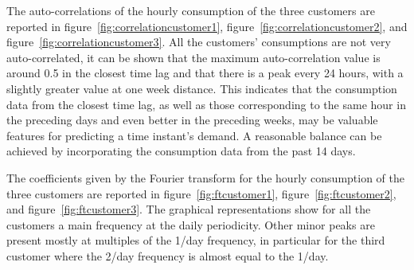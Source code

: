 The auto-correlations of the hourly consumption of the three customers are reported in figure~\ref{fig:correlationcustomer1}, figure~\ref{fig:correlationcustomer2}, and figure~\ref{fig:correlationcustomer3}.
All the customers’ consumptions are not very auto-correlated, it can be shown that the maximum auto-correlation value is around 0.5 in the closest time lag and that there is a peak every 24 hours, with a slightly greater value at one week distance.
This indicates that the consumption data from the closest time lag, as well as those corresponding to the same hour in the preceding days and even better in the preceding weeks, may be valuable features for predicting a time instant's demand.
A reasonable balance can be achieved by incorporating the consumption data from the past 14 days.

The coefficients given by the Fourier transform for the hourly consumption of the three customers are reported in figure~\ref{fig:ftcustomer1}, figure~\ref{fig:ftcustomer2}, and figure~\ref{fig:ftcustomer3}.
The graphical representations show for all the customers a main frequency at the daily periodicity.
Other minor peaks are present mostly at multiples of the 1/day frequency, in particular for the third customer where the 2/day frequency is almost equal to the 1/day.

